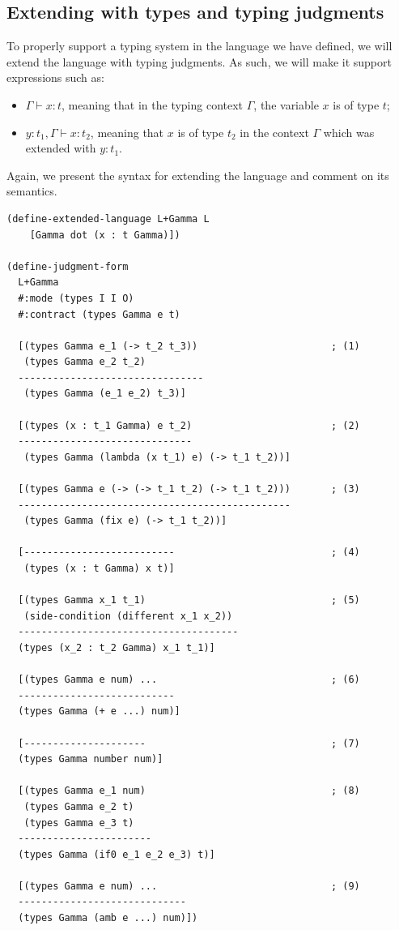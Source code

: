 \subsection{Extending with types and typing judgments}

To properly support a typing system in the language we have defined, we will
extend the language with typing judgments. As such, we will make it support
expressions such as:
\begin{itemize}
\item $ \Gamma \vdash x : t $, meaning that in the typing context $ \Gamma $,
  the variable $ x $ is of type $ t $;
\item $ y : t_1, \Gamma \vdash x : t_2 $, meaning that $ x $ is of type $ t_2 $
  in the context $ \Gamma $ which was extended with $ y : t_1 $.
\end{itemize}

Again, we present the syntax for extending the language and comment on its
semantics.

\newpage

{
  \small
\begin{verbatim}
(define-extended-language L+Gamma L
    [Gamma dot (x : t Gamma)])

(define-judgment-form
  L+Gamma
  #:mode (types I I O)
  #:contract (types Gamma e t)

  [(types Gamma e_1 (-> t_2 t_3))                       ; (1)
   (types Gamma e_2 t_2)
  --------------------------------
   (types Gamma (e_1 e_2) t_3)]

  [(types (x : t_1 Gamma) e t_2)                        ; (2)
  ------------------------------
   (types Gamma (lambda (x t_1) e) (-> t_1 t_2))]

  [(types Gamma e (-> (-> t_1 t_2) (-> t_1 t_2)))       ; (3)
  -----------------------------------------------
   (types Gamma (fix e) (-> t_1 t_2))]

  [--------------------------                           ; (4)
   (types (x : t Gamma) x t)]

  [(types Gamma x_1 t_1)                                ; (5)
   (side-condition (different x_1 x_2))
  --------------------------------------
  (types (x_2 : t_2 Gamma) x_1 t_1)]

  [(types Gamma e num) ...                              ; (6)
  ---------------------------
  (types Gamma (+ e ...) num)]

  [---------------------                                ; (7)
  (types Gamma number num)]

  [(types Gamma e_1 num)                                ; (8)
   (types Gamma e_2 t)
   (types Gamma e_3 t)
  -----------------------
  (types Gamma (if0 e_1 e_2 e_3) t)]

  [(types Gamma e num) ...                              ; (9)
  -----------------------------
  (types Gamma (amb e ...) num)])
\end{verbatim}
}

